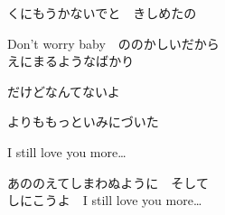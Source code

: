 {くにもうかないでと　きしめたの

Don't worry baby　ののかしいだから
\\

えにまるようなばかり

だけどなんてないよ

よりももっといみにづいた

I still love you more…

あののえてしまわぬように　そして
\\

しにこうよ　I still love you more…

}